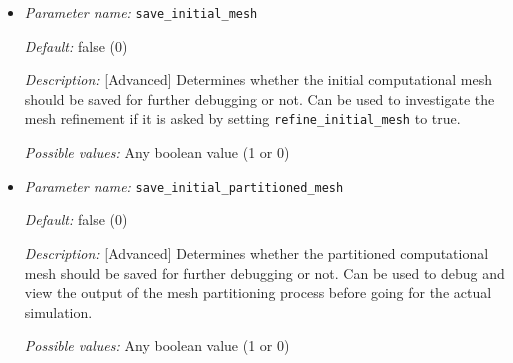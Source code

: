 \begin{itemize}
{\it Possible values:} Any boolean value (1 or 0)


\item {\it Parameter name:} {\tt save\_initial\_mesh}
\label{parameters:save_initial_mesh}


{\it Default:} false (0)

{\it Description:} [Advanced] Determines whether the initial computational mesh should be saved for further debugging or not. Can be used to investigate the mesh refinement if it is asked by setting {\tt refine\_initial\_mesh} to true.

{\it Possible values:} Any boolean value (1 or 0)


\item {\it Parameter name:} {\tt save\_initial\_partitioned\_mesh}
\label{parameters:save_initial_partitioned_mesh}


{\it Default:} false (0)

{\it Description:} [Advanced] Determines whether the partitioned computational mesh should be saved for further debugging or not. Can be used to debug and view the output of the mesh partitioning process before going for the actual simulation.

{\it Possible values:} Any boolean value (1 or 0)


\end{itemize}
